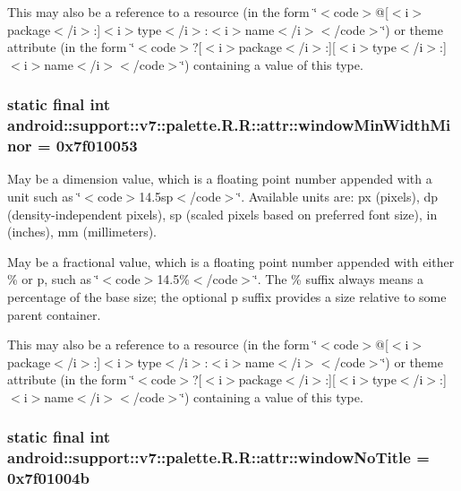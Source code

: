 This may also be a reference to a resource (in the form \char`\"{}$<$code$>$@\mbox{[}$<$i$>$package$<$/i$>$:\mbox{]}$<$i$>$type$<$/i$>$:$<$i$>$name$<$/i$>$$<$/code$>$\char`\"{}) or theme attribute (in the form \char`\"{}$<$code$>$?\mbox{[}$<$i$>$package$<$/i$>$:\mbox{]}\mbox{[}$<$i$>$type$<$/i$>$:\mbox{]}$<$i$>$name$<$/i$>$$<$/code$>$\char`\"{}) containing a value of this type. \hypertarget{classandroid_1_1support_1_1v7_1_1palette_1_1_r_1_1attr_83c00d779738c012f7934cc3c135adb9}{
\subsubsection[{windowMinWidthMinor}]{\setlength{\rightskip}{0pt plus 5cm}static final int android::support::v7::palette.R.R::attr::windowMinWidthMinor = 0x7f010053}}
\label{classandroid_1_1support_1_1v7_1_1palette_1_1_r_1_1attr_83c00d779738c012f7934cc3c135adb9}


May be a dimension value, which is a floating point number appended with a unit such as \char`\"{}$<$code$>$14.5sp$<$/code$>$\char`\"{}. Available units are: px (pixels), dp (density-independent pixels), sp (scaled pixels based on preferred font size), in (inches), mm (millimeters). 

May be a fractional value, which is a floating point number appended with either \% or p, such as \char`\"{}$<$code$>$14.5\%$<$/code$>$\char`\"{}. The \% suffix always means a percentage of the base size; the optional p suffix provides a size relative to some parent container. 

This may also be a reference to a resource (in the form \char`\"{}$<$code$>$@\mbox{[}$<$i$>$package$<$/i$>$:\mbox{]}$<$i$>$type$<$/i$>$:$<$i$>$name$<$/i$>$$<$/code$>$\char`\"{}) or theme attribute (in the form \char`\"{}$<$code$>$?\mbox{[}$<$i$>$package$<$/i$>$:\mbox{]}\mbox{[}$<$i$>$type$<$/i$>$:\mbox{]}$<$i$>$name$<$/i$>$$<$/code$>$\char`\"{}) containing a value of this type. \hypertarget{classandroid_1_1support_1_1v7_1_1palette_1_1_r_1_1attr_c89a8f76987eb23742233f385a7b29b7}{
\subsubsection[{windowNoTitle}]{\setlength{\rightskip}{0pt plus 5cm}static final int android::support::v7::palette.R.R::attr::windowNoTitle = 0x7f01004b}}
\label{classandroid_1_1support_1_1v7_1_1palette_1_1_r_1_1attr_c89a8f76987eb23742233f385a7b29b7}


